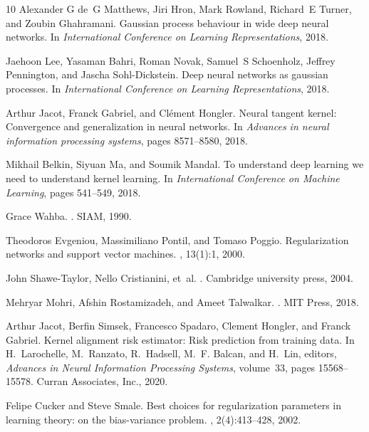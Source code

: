 \documentclass[11pt]{article}
\begin{document}
\begin{thebibliography}{10}
Alexander G de~G Matthews, Jiri Hron, Mark Rowland, Richard~E Turner, and
  Zoubin Ghahramani.
\newblock Gaussian process behaviour in wide deep neural networks.
\newblock In {\em International Conference on Learning Representations}, 2018.

Jaehoon Lee, Yasaman Bahri, Roman Novak, Samuel~S Schoenholz, Jeffrey
  Pennington, and Jascha Sohl-Dickstein.
\newblock Deep neural networks as gaussian processes.
\newblock In {\em International Conference on Learning Representations}, 2018.

Arthur Jacot, Franck Gabriel, and Cl{\'e}ment Hongler.
\newblock Neural tangent kernel: Convergence and generalization in neural
  networks.
\newblock In {\em Advances in neural information processing systems}, pages
  8571--8580, 2018.

Mikhail Belkin, Siyuan Ma, and Soumik Mandal.
\newblock To understand deep learning we need to understand kernel learning.
\newblock In {\em International Conference on Machine Learning}, pages
  541--549, 2018.

Grace Wahba.
.
\newblock SIAM, 1990.

Theodoros Evgeniou, Massimiliano Pontil, and Tomaso Poggio.
\newblock Regularization networks and support vector machines.
, 13(1):1, 2000.

John Shawe-Taylor, Nello Cristianini, et~al.
.
\newblock Cambridge university press, 2004.

Mehryar Mohri, Afshin Rostamizadeh, and Ameet Talwalkar.
.
\newblock MIT Press, 2018.

Arthur Jacot, Berfin Simsek, Francesco Spadaro, Clement Hongler, and Franck
  Gabriel.
\newblock Kernel alignment risk estimator: Risk prediction from training data.
\newblock In H.~Larochelle, M.~Ranzato, R.~Hadsell, M.~F. Balcan, and H.~Lin,
  editors, {\em Advances in Neural Information Processing Systems}, volume~33,
  pages 15568--15578. Curran Associates, Inc., 2020.

Felipe Cucker and Steve Smale.
\newblock Best choices for regularization parameters in learning theory: on the
  bias-variance problem.
, 2(4):413--428, 2002.


\end{thebibliography}
\end{document}
